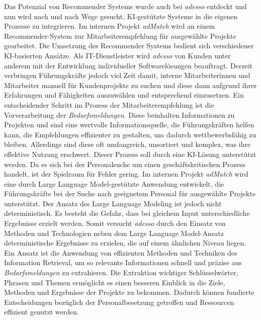 Das Potenzial von Recommender Systems wurde auch bei \emph{adesso} entdeckt und nun wird nach und nach Wege gesucht, KI-gestützte Systeme in die eigenen Prozesse zu integrieren. Im internen Projekt \emph{adMatch} wird an einem Recommender-System zur Mitarbeiterempfehlung für ausgewählte Projekte gearbeitet. Die Umsetzung des Recommender Systems bedient sich verschiedener KI-basierten Ansätze. Als IT-Dienstleister wird \emph{adesso} von Kunden unter anderem mit der Entwicklung individueller Softwarelösungen beauftragt. Derzeit verbringen Führungskräfte jedoch viel Zeit damit, interne Mitarbeiterinnen und Mitarbeiter manuell für Kundenprojekte zu suchen und diese dann aufgrund ihrer Erfahrungen und Fähigkeiten auszuwählen und entsprechend einzusetzen. Ein entscheidender Schritt im Prozess der Mitarbeiterempfehlung ist die Vorverarbeitung der \emph{Bedarfsmeldungen}. Diese beinhalten Informationen zu Projekten und sind eine wertvolle Informationsquelle, die Führungskräften helfen kann, die Empfehlungen effizienter zu gestalten, um dadurch wettbewerbsfähig zu bleiben. Allerdings sind diese oft umfangreich, unsortiert und komplex, was ihre effektive Nutzung erschwert. Dieser Prozess soll durch eine KI-Lösung unterstützt werden. Da es sich bei der Personalsuche um einen geschäftskritischen Prozess handelt, ist der Spielraum für Fehler gering. Im internen Projekt \emph{adMatch} wird eine durch Large Language Model-gestützte Anwendung entwickelt, die Führungskräfte bei der Suche nach geeignetem Personal für ausgewählte Projekte unterstützt. Der Ansatz des Large Language Modeling ist jedoch nicht deterministisch. Es besteht die Gefahr, dass bei gleichem Input unterschiedliche Ergebnisse erzielt werden. Somit versucht \emph{adesso} durch den Einsatz von Methoden und Technologien neben dem Large Language Model-Ansatz deterministische Ergebnisse zu erzielen, die auf einem ähnlichen Niveau liegen. Ein Ansatz ist die Anwendung von effizienten Methoden und Techniken des Information Retrieval, um so relevante Informationen schnell und präzise aus \emph{Bedarfsmeldungen} zu extrahieren. Die Extraktion wichtiger Schlüsselwörter, Phrasen und Themen ermöglicht es einen besseren Einblick in die Ziele, Methoden und Ergebnisse der Projekte zu bekommen. Dadurch können fundierte Entscheidungen bezüglich der Personalbesetzung getroffen und Ressourcen effizient genutzt werden.\\
